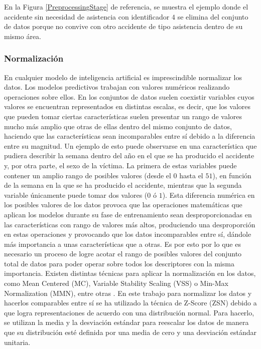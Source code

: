 En la Figura \ref{PreprocessingStage} de referencia, se muestra el ejemplo donde el accidente sin necesidad de asistencia con identificador $4$ se elimina del conjunto de datos porque no convive con otro accidente de tipo asistencia dentro de su mismo área.


\subsubsection{Normalización}

En cualquier modelo de inteligencia artificial es imprescindible normalizar los datos. Los modelos predictivos trabajan con valores numéricos realizando operaciones sobre ellos. En los conjuntos de datos suelen coexistir variables cuyos valores se encuentran representados en distintas escalas, es decir, que los valores que pueden tomar ciertas características suelen presentar un rango de valores mucho más amplio que otras de ellas dentro del mismo conjunto de datos, haciendo que las características sean incomparables entre sí debido a la diferencia entre su magnitud. Un ejemplo de esto puede observarse en una característica que pudiera describir la semana dentro del año en el que se ha producido el accidente y, por otra parte, el sexo de la víctima. La primera de estas variables puede contener un amplio rango de posibles valores (desde el $0$ hasta el $51$), en función de la semana en la que se ha producido el accidente, mientras que la segunda variable únicamente puede tomar dos valores ($0$ ó $1$). Esta diferencia numérica en los posibles valores de los datos provoca que las operaciones matemáticas que aplican los modelos durante su fase de entrenamiento sean desproporcionadas en las características con rango de valores más altos, produciendo una desproporción en estas operaciones y provocando que los datos incomparables entre sí, dándole más importancia a unas características que a otras. Es por esto por lo que es necesario un proceso de logre acotar el rango de posibles valores del conjunto total de datos para poder operar sobre todos los descriptores con la misma importancia. Existen distintas técnicas para aplicar la normalización en los datos, como Mean Centered (MC), Variable Stability Scaling (VSS) o Min-Max Normalization (MMN), entre otras \cite{DataNormalizationInvestigation}. En este trabajo para normalizar los datos y hacerlos comparables entre sí se ha utilizado la técnica de Z-Score (ZSN) debido a que logra representaciones de acuerdo con una distribución normal. Para hacerlo, se utilizan la media y la desviación estándar para reescalar los datos de manera que su distribución esté definida por una media de cero y una desviación estándar unitaria.

